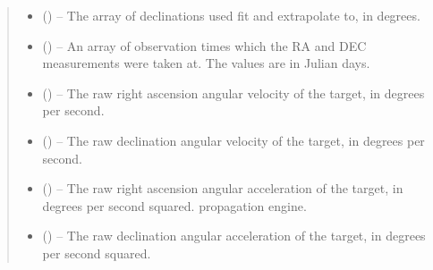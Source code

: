 \documentclass[letterpaper,11pt,english]{sphinxmanual}
\begin{document}
\begin{savenotes}
\begin{fulllineitems}
\begin{savenotes}
\begin{fulllineitems}
\begin{quote}
\begin{description}
\begin{itemize}
\item {} 
\sphinxAtStartPar
{} () – The array of declinations used fit and extrapolate to, in degrees.

\item {} 
\sphinxAtStartPar
{} () – An array of observation times which the RA and DEC measurements
were taken at. The values are in Julian days.

\end{itemize}

\sphinxAtStartPar
\begin{itemize}
\item {} 
\sphinxAtStartPar
{} () – The raw right ascension angular velocity of the target, in degrees
per second.

\item {} 
\sphinxAtStartPar
{} () – The raw declination angular velocity of the target, in degrees per
second.

\item {} 
\sphinxAtStartPar
{} () – The raw right ascension angular acceleration of the target, in
degrees per second squared.
propagation engine.

\item {} 
\sphinxAtStartPar
{} () – The raw declination angular acceleration of the target, in
degrees per second squared.

\end{itemize}


\end{description}\end{quote}

\end{fulllineitems}\end{savenotes}



\end{fulllineitems}
\end{savenotes}
\end{document}
